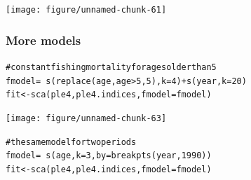 \documentclass[a4paper,english,10pt]{article}\usepackage[]{graphicx}\usepackage[]{color}
\makeatletter
\newcommand{\hlnum}[1]{\textcolor[rgb]{0.2,0.2,0.2}{#1}}%
\newcommand{\hlcom}[1]{\textcolor[rgb]{0.2,0.267,0.4}{#1}}%
\newcommand{\hlopt}[1]{\textcolor[rgb]{0.2,0.2,0.2}{#1}}%
\newcommand{\hlstd}[1]{\textcolor[rgb]{0,0,0}{#1}}%
\newcommand{\hlkwb}[1]{\textcolor[rgb]{0.361,0.506,0.596}{#1}}%
\newcommand{\hlkwc}[1]{\textcolor[rgb]{0.361,0.506,0.596}{#1}}%
\newcommand{\hlkwd}[1]{\textcolor[rgb]{0.361,0.506,0.596}{#1}}%
\newenvironment{kframe}{%
 \def\at@end@of@kframe{}%
 \ifinner\ifhmode%
  \def\at@end@of@kframe{\end{minipage}}%
  \begin{minipage}{\columnwidth}%
 \fi\fi%
 \def\FrameCommand##1{\hskip\@totalleftmargin \hskip-\fboxsep
 \colorbox{shadecolor}{##1}\hskip-\fboxsep
     \hskip-\linewidth \hskip-\@totalleftmargin \hskip\columnwidth}%
 \MakeFramed {\advance\hsize-\width
   \@totalleftmargin\z@ \linewidth\hsize
   \@setminipage}}%
 {\par\unskip\endMakeFramed%
 \at@end@of@kframe}
\newenvironment{knitrout}{}{} %
\makeatother
\begin{document}
\begin{knitrout}
\color{fgcolor}

{\centering \texttt{[image: figure/unnamed-chunk-61]} 

}



\end{knitrout}


\subsubsection{More models}

\begin{knitrout}
\color{fgcolor}\begin{kframe}
\begin{alltt}
\hlcom{# constant fishing mortality for ages older than 5}
\hlstd{fmodel} \hlkwb{=} \hlopt{~}\hlkwd{s}\hlstd{(}\hlkwd{replace}\hlstd{(age, age} \hlopt{>} \hlnum{5}\hlstd{,} \hlnum{5}\hlstd{),} \hlkwc{k} \hlstd{=} \hlnum{4}\hlstd{)} \hlopt{+} \hlkwd{s}\hlstd{(year,} \hlkwc{k} \hlstd{=} \hlnum{20}\hlstd{)}
\hlstd{fit} \hlkwb{<-} \hlkwd{sca}\hlstd{(ple4, ple4.indices,} \hlkwc{fmodel} \hlstd{= fmodel)}
\end{alltt}
\end{kframe}
\end{knitrout}


\begin{knitrout}
\color{fgcolor}

{\centering \texttt{[image: figure/unnamed-chunk-63]} 

}



\end{knitrout}


\begin{knitrout}
\color{fgcolor}\begin{kframe}
\begin{alltt}
\hlcom{# the same model for two periods}
\hlstd{fmodel} \hlkwb{=} \hlopt{~}\hlkwd{s}\hlstd{(age,} \hlkwc{k} \hlstd{=} \hlnum{3}\hlstd{,} \hlkwc{by} \hlstd{=} \hlkwd{breakpts}\hlstd{(year,} \hlnum{1990}\hlstd{))}
\hlstd{fit} \hlkwb{<-} \hlkwd{sca}\hlstd{(ple4, ple4.indices,} \hlkwc{fmodel} \hlstd{= fmodel)}
\end{alltt}
\end{kframe}
\end{knitrout}
\end{document}
